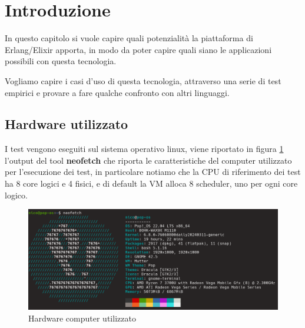 \section{Introduzione}
In questo capitolo si vuole capire quali potenzialità
la piattaforma di Erlang/Elixir apporta, in modo da poter
capire quali siano le applicazioni possibili con questa tecnologia.

Vogliamo capire i casi d'uso di questa tecnologia, attraverso una serie
di test empirici e provare a fare qualche confronto con altri
linguaggi.

\subsection{Hardware utilizzato}

I test vengono eseguiti sul sistema operativo linux, viene riportato in
figura \ref{fig:neofetch} l'output del tool \textbf{neofetch} che riporta
le caratteristiche del computer utilizzato per l'esecuzione dei test,
in particolare notiamo che la CPU di riferimento dei test
ha 8 core logici e 4 fisici, e di default la VM alloca 8 scheduler,
uno per ogni core logico.

\begin{figure}[!htp]
    \centering
    \includegraphics[keepaspectratio=true,scale=0.33]{images/neofetch.png}
	\caption{Hardware computer utilizzato}
  	\label{fig:neofetch}
\end{figure}



